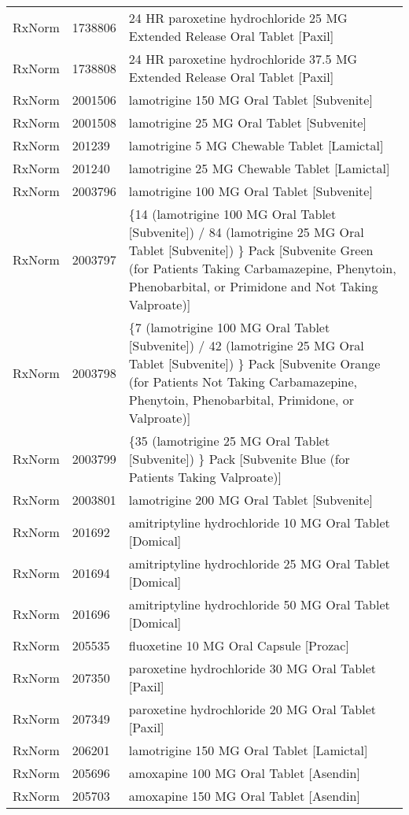 \begin{longtable}{p{}p{}p{}}
  RxNorm & 1738806 & 24 HR paroxetine hydrochloride 25 MG Extended Release Oral Tablet [Paxil] \\ 
  RxNorm & 1738808 & 24 HR paroxetine hydrochloride 37.5 MG Extended Release Oral Tablet [Paxil] \\ 
  RxNorm & 2001506 & lamotrigine 150 MG Oral Tablet [Subvenite] \\ 
  RxNorm & 2001508 & lamotrigine 25 MG Oral Tablet [Subvenite] \\ 
  RxNorm & 201239 & lamotrigine 5 MG Chewable Tablet [Lamictal] \\ 
  RxNorm & 201240 & lamotrigine 25 MG Chewable Tablet [Lamictal] \\ 
  RxNorm & 2003796 & lamotrigine 100 MG Oral Tablet [Subvenite] \\ 
  RxNorm & 2003797 & \{14 (lamotrigine 100 MG Oral Tablet [Subvenite]) / 84 (lamotrigine 25 MG Oral Tablet [Subvenite]) \} Pack [Subvenite Green (for Patients Taking Carbamazepine, Phenytoin, Phenobarbital, or Primidone and Not Taking Valproate)] \\ 
  RxNorm & 2003798 & \{7 (lamotrigine 100 MG Oral Tablet [Subvenite]) / 42 (lamotrigine 25 MG Oral Tablet [Subvenite]) \} Pack [Subvenite Orange (for Patients Not Taking Carbamazepine, Phenytoin, Phenobarbital, Primidone, or Valproate)] \\ 
  RxNorm & 2003799 & \{35 (lamotrigine 25 MG Oral Tablet [Subvenite]) \} Pack [Subvenite Blue (for Patients Taking Valproate)] \\ 
  RxNorm & 2003801 & lamotrigine 200 MG Oral Tablet [Subvenite] \\ 
  RxNorm & 201692 & amitriptyline hydrochloride 10 MG Oral Tablet [Domical] \\ 
  RxNorm & 201694 & amitriptyline hydrochloride 25 MG Oral Tablet [Domical] \\ 
  RxNorm & 201696 & amitriptyline hydrochloride 50 MG Oral Tablet [Domical] \\ 
  RxNorm & 205535 & fluoxetine 10 MG Oral Capsule [Prozac] \\ 
  RxNorm & 207350 & paroxetine hydrochloride 30 MG Oral Tablet [Paxil] \\ 
  RxNorm & 207349 & paroxetine hydrochloride 20 MG Oral Tablet [Paxil] \\ 
  RxNorm & 206201 & lamotrigine 150 MG Oral Tablet [Lamictal] \\ 
  RxNorm & 205696 & amoxapine 100 MG Oral Tablet [Asendin] \\ 
  RxNorm & 205703 & amoxapine 150 MG Oral Tablet [Asendin] \\ 

\end{longtable}
